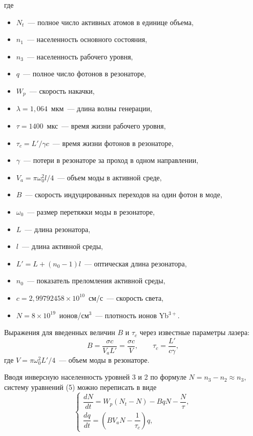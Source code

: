 \documentclass[12pt]{article}
\begin{document}
где
\begin{itemize}
    \item $N_t$~--- полное число активных атомов в единице объема,
    \item $n_1$~--- населенность основного состояния,
    \item $n_3$~--- населенность рабочего уровня,
    \item $q$~--- полное число фотонов в резонаторе,
    \item $W_p$~--- скорость накачки,
    \item $\lambda = 1{,}064$~мкм~--- длина волны генерации,
    \item $\tau = 1400$~мкс~--- время жизни рабочего уровня,
    \item $\tau_c = L'/\gamma c$~--- время жизни фотонов в резонаторе,
    \item $\gamma$~--- потери в резонаторе за проход в одном направлении,
    \item $V_a = \pi \omega_0^2 l / 4$~--- объем моды в активной среде,
    \item $B$~--- скорость индуцированных переходов на один фотон в моде,
    \item $\omega_0$~--- размер перетяжки моды в резонаторе,
    \item $L$~--- длина резонатора,
    \item $l$~--- длина активной среды,
    \item $L' = L + (n_0 - 1)l$~--- оптическая длина резонатора,
    \item $n_0$~--- показатель преломления активной среды,
    \item $c = 2{,}99792458 \times 10^{10}$~см/с~--- скорость света,
    \item $N = 8 \times 10^{19}$~ионов/см$^3$~--- плотность ионов Yb${}^{3+}$.
\end{itemize}

Выражения для введенных величин $B$ и $\tau_c$ через известные параметры лазера:
\[
B = \frac{\sigma c}{V_a L'} = \frac{\sigma c}{V}, \qquad \tau_c = \frac{L'}{c\gamma},\tag{6}
\]
где $V = \pi\omega_0^2 L'/4$~--- объем моды в резонаторе.

\newpage

Вводя инверсную населенность уровней 3 и 2 по формуле $N = n_3 - n_2 \approx n_3$, систему уравнений (5) можно переписать в виде
\[
\begin{cases}\tag{7}
\dfrac{dN}{dt} = W_p (N_t - N) - B q N - \dfrac{N}{\tau}, \\[10pt]
\dfrac{dq}{dt} = \left( B V_a N - \dfrac{1}{\tau_c} \right) q,
\end{cases}
\]
\end{document}
